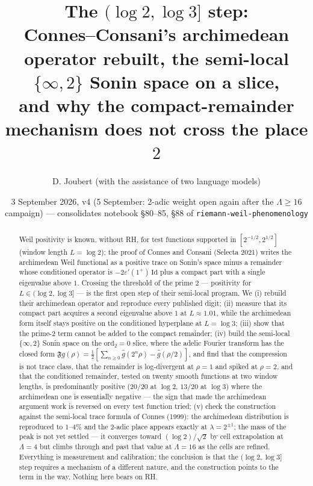 \documentclass[11pt]{article}
\title{The $(\log 2,\log 3]$ step:\\ \large Connes--Consani's archimedean operator rebuilt, the semi-local $\{\infty,2\}$ Sonin space on a slice,\\ and why the compact-remainder mechanism does not cross the place $2$}
\author{D. Joubert (with the assistance of two language models)}
\date{3 September 2026, v4 (5 September: 2-adic weight open again after the $\Lambda\ge16$ campaign) --- consolidates notebook \S80--85, \S88 of \texttt{riemann-weil-phenomenology}}
\begin{document}
\maketitle
\begin{abstract}
Weil positivity is known, without RH, for test functions supported in $[2^{-1/2},2^{1/2}]$ (window length $L=\log 2$); the proof of Connes and Consani (Selecta 2021) writes the archimedean Weil functional as a positive trace on Sonin's space minus a remainder whose conditioned operator is $-2\varepsilon'(1^+)\,\mathrm{Id}$ plus a compact part with a single eigenvalue above $1$. Crossing the threshold of the prime $2$ --- positivity for $L\in(\log 2,\log 3]$ --- is the first open step of their semi-local program. We (i) rebuild their archimedean operator and reproduce every published digit; (ii) measure that its compact part acquires a second eigenvalue above $1$ at $L\approx1.01$, while the archimedean form itself stays positive on the conditioned hyperplane at $L=\log 3$; (iii) show that the prime-$2$ term cannot be added to the compact remainder; (iv) build the semi-local $\{\infty,2\}$ Sonin space on the $\mathrm{ord}_2=0$ slice, where the adelic Fourier transform has the closed form $\mathfrak Fg(\rho)=\tfrac12[\sum_{n\ge0}\hat g(2^n\rho)-\hat g(\rho/2)]$, and find that the compression is not trace class, that the remainder is log-divergent at $\rho=1$ and spiked at $\rho=2$, and that the conditioned remainder, tested on twenty smooth functions at two window lengths, is predominantly positive ($20/20$ at $\log2$, $13/20$ at $\log3$) where the archimedean one is essentially negative --- the sign that made the archimedean argument work is reversed on every test function tried; (v) check the construction against the semi-local trace formula of Connes (1999): the archimedean distribution is reproduced to $1$--$4\%$ and the $2$-adic place appears exactly at $\lambda=2^{\pm1}$; the mass of the peak is not yet settled --- it converges toward $(\log2)/\sqrt2$ by cell extrapolation at $\Lambda=4$ but climbs through and past that value at $\Lambda=16$ as the cells are refined. Everything is measurement and calibration; the conclusion is that the $(\log2,\log3]$ step requires a mechanism of a different nature, and the construction points to the term in the way. Nothing here bears on RH.
\end{abstract}
\end{document}
